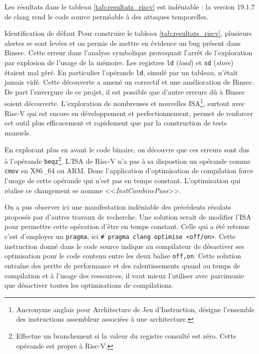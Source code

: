Les résultats dans le tableau \ref{tab:resultats_riscv} est indéniable : la version 19.1.7 de clang rend le code source perméable à des attaques temporelles.\medbreak

\begin{CitationBox}{Identification de défaut}
    Pour construire le tableau \ref{tab:resultats_riscv}, plusieurs alertes se sont levées et on permis de mettre en évidence un bug présent dans Binsec. Cette erreur dans l'analyse symbolique provoquait l'arrêt de l'exploration par explosion de l'usage de la mémoire. Les registres \texttt{ld} (\textit{load}) et \texttt{sd} (\textit{store}) étaient mal géré. En particulier l'opérande \texttt{ld}, simulé par un tableau, n'était jamais vidé. Cette découverte a amené un correctif et une amélioration de Binsec. De part l'envergure de ce projet, il est possible que d'autre erreurs dû à Binsec soient découverte. L'exploration de nombreuses et nouvelles ISA\footnote{Ancronyme anglais pour Architecture de Jeu d'Instruction, désigne l'ensemble des instructions assembleur associées à une architecture.}, surtout avec Risc-V qui est encore en développement et perfectionnement, permet de renforcer cet outil plus efficacement et rapidement que par la construction de tests manuels.\medbreak
\end{CitationBox}
    
    


En explorant plus en avant le code binaire, on découvre que ces erreurs sont dus à l'opérande \texttt{beqz}\footnote{Effectue un branchement si la valeur du registre consulté est zéro. Cette opérande est propre à Risc-V.}. L'ISA de Risc-V n'a pas à sa dispostion un opérande comme \texttt{cmov} en X86\_64 ou ARM. Donc l'application d'optimisation de compilation force l'usage de cette opérande qui n'est pas en temps constant. L'optimisation qui réalise ce changement se nomme <<\textit{InstCombinePass}>>.\medbreak

On a pus observer ici une manifestation indéniable des précédents résulats proposés par d'autres travaux de recherche. Une solution serait de modifier l'ISA pour permettre cette opération d'être en temps constant. Celle qui a été retenue c'est d'employer un \texttt{pragma}, ici \texttt{\# pragma clang optimise <off/on>}. Cette instruction donné dans le code source indique au compilateur de désactiver ses optmisation pour le code contenu entre les deux balise \texttt{off,on}. Cette solution entraîne des pertte de performance et des ralentissements quand au temps de compilation et à l'usage des ressources, il vaut mieux l'utiliser avec parcimonie que désactiver toutes les optimisations de compilations.\medbreak

